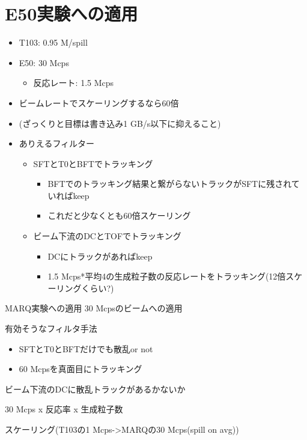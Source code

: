 \documentclass[../main.tex]{subfiles}
\begin{document}
\section{E50実験への適用}
\label{sec:methods}
\begin{tcolorbox}[
  title=執筆メモ,
  colback=yellow!8,
  colframe=black!30,
  breakable
]
\begin{itemize}
  \item T103: 0.95 M/spill
  \item E50: 30 Mcps
  \begin{itemize}
    \item 反応レート: 1.5 Mcps
  \end{itemize}
  \item ビームレートでスケーリングするなら60倍
  \item (ざっくりと目標は書き込み1 GB/s以下に抑えること)
  \item ありえるフィルター
  \begin{itemize}
    \item SFTとT0とBFTでトラッキング
    \begin{itemize}
      \item BFTでのトラッキング結果と繋がらないトラックがSFTに残されていればkeep
      \item これだと少なくとも60倍スケーリング
    \end{itemize}
    \item ビーム下流のDCとTOFでトラッキング
    \begin{itemize}
      \item DCにトラックがあればkeep
      \item 1.5 Mcps*平均4の生成粒子数の反応レートをトラッキング(12倍スケーリングくらい?)
    \end{itemize}
  \end{itemize}
\end{itemize}
\end{tcolorbox}
MARQ実験への適用
30 Mcpsのビームへの適用

有効そうなフィルタ手法
\begin{itemize}
  \item SFTとT0とBFTだけでも散乱or not
  \item 60 Mcpsを真面目にトラッキング
\end{itemize}

ビーム下流のDCに散乱トラックがあるかないか

30 Mcps x 反応率 x 生成粒子数

スケーリング(T103の1 Mcps->MARQの30 Mcps(spill on avg))
\end{document}
